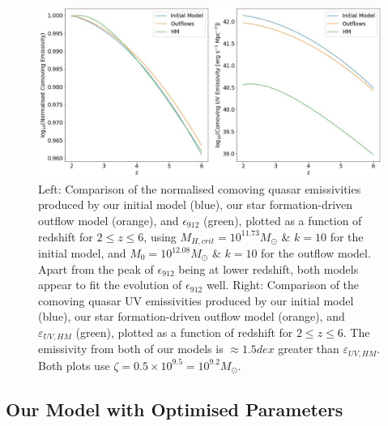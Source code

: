 \documentclass[12pt, twocolumn]{article}%
\begin{document}
\begin{figure}[H]
\centering
\includegraphics[width=\linewidth]{Plot_14.jpeg}
\caption{Left: Comparison of the normalised comoving quasar emissivities produced by our initial model (blue), our star formation-driven outflow model (orange), and $\epsilon_{912}$ (green), plotted as a function of redshift for $2\leq z\leq6$, using $M_{H,crit}=10^{11.73}M_\odot$ \& $k=10$ for the initial model, and $M_0=10^{12.08}M_\odot$ \& $k=10$ for the outflow model. Apart from the peak of $\epsilon_{912}$ being at lower redshift, both models appear to fit the evolution of $\epsilon_{912}$ well. Right: Comparison of the comoving quasar UV emissivities produced by our initial model (blue), our star formation-driven outflow model (orange), and $\varepsilon_{UV,HM}$ (green), plotted as a function of redshift for $2\leq z\leq6$. The emissivity from both of our models is $\approx1.5dex$ greater than $\varepsilon_{UV,HM}$. Both plots use $\zeta=0.5\times10^{9.5}=10^{9.2}M_\odot$.}
\label{fig:15}
\end{figure}

\twocolumngrid


\subsection{Our Model with Optimised Parameters}
\end{document}
